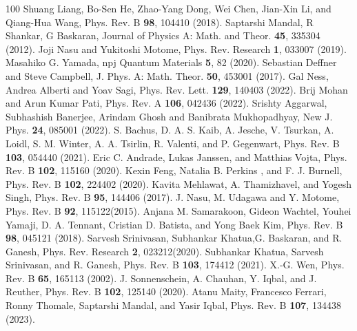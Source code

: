 \documentclass[aps,amsmath,twocolumn,amssymb,floatfix,showpacs,superscriptaddress,nofootinbib,longbibliography]{revtex4-1}
\begin{document}
\begin{thebibliography}{100}
Shuang Liang, Bo-Sen He, Zhao-Yang Dong, Wei Chen, Jian-Xin Li, and Qiang-Hua Wang, Phys. Rev. B {\bf 98}, 104410 (2018).
Saptarshi Mandal, R Shankar, G Baskaran, Journal of Physics A: Math. and Theor. {\bf 45}, 335304 (2012).
Joji Nasu and Yukitoshi Motome, Phys. Rev. Research  {\bf 1}, 033007 (2019).
 Masahiko G. Yamada, npj Quantum Materials {\bf 5}, 82 (2020).
Sebastian Deffner and Steve Campbell, J. Phys. A: Math. Theor. {\bf 50}, 453001 (2017).
Gal Ness, Andrea Alberti and Yoav Sagi, Phys. Rev. Lett. {\bf 129}, 140403 (2022).
Brij Mohan  and Arun Kumar Pati, Phys. Rev. A {\bf 106}, 042436 (2022).
Srishty Aggarwal, Subhashish Banerjee, Arindam Ghosh and Banibrata Mukhopadhyay,  New J. Phys. {\bf 24}, 085001 (2022).
S. Bachus, D. A. S. Kaib, A. Jesche, V. Tsurkan, A. Loidl,  S. M. Winter,
A. A. Tsirlin, R. Valenti, and P. Gegenwart, Phys. Rev. B {\bf 103}, 054440 (2021).
 Eric C. Andrade, Lukas Janssen, and Matthias Vojta, Phys. Rev. B {\bf 102}, 115160 (2020).
Kexin Feng, Natalia B. Perkins , and F. J. Burnell, Phys. Rev. B {\bf 102}, 224402 (2020).
Kavita Mehlawat, A. Thamizhavel, and Yogesh Singh, Phys. Rev. B {\bf 95}, 144406 (2017).
J. Nasu, M. Udagawa and Y. Motome, Phys. Rev. B {\bf 92}, 115122(2015).
 Anjana M. Samarakoon, Gideon Wachtel, Youhei Yamaji, D. A. Tennant, Cristian D. Batista, and Yong Baek Kim, Phys. Rev. B {\bf 98}, 045121 (2018).
 Sarvesh Srinivasan, Subhankar Khatua,G. Baskaran, and R. Ganesh, Phys. Rev. Research {\bf 2}, 023212(2020).
Subhankar Khatua, Sarvesh Srinivasan, and R. Ganesh, Phys. Rev. B {\bf 103}, 174412 (2021).
X.-G. Wen, Phys. Rev. B {\bf 65}, 165113 (2002).
J. Sonnenschein, A. Chauhan, Y. Iqbal, and J. Reuther, Phys. Rev. B {\bf 102}, 125140 (2020).
Atanu Maity, Francesco Ferrari, Ronny Thomale, Saptarshi Mandal, and Yasir Iqbal, Phys. Rev. B {\bf 107}, 134438 (2023).

\end{thebibliography}
\end{document}
